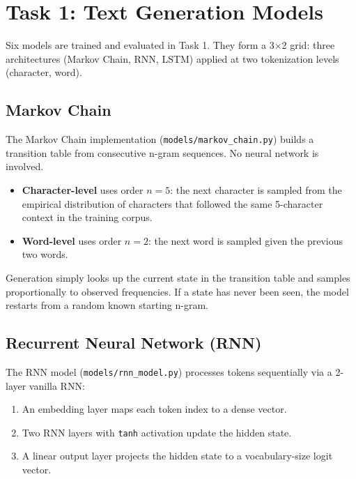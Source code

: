 \section{Task 1: Text Generation Models}
\label{sec:task1}

Six models are trained and evaluated in Task 1. They form a 3$\times$2 grid:
three architectures (Markov Chain, RNN, LSTM) applied at two tokenization levels
(character, word).

\subsection{Markov Chain}

The Markov Chain implementation (\texttt{models/markov\_chain.py}) builds a
transition table from consecutive n-gram sequences. No neural network is involved.

\begin{itemize}
    \item \textbf{Character-level} uses order $n = 5$: the next character is
          sampled from the empirical distribution of characters that followed the
          same 5-character context in the training corpus.
    \item \textbf{Word-level} uses order $n = 2$: the next word is sampled given
          the previous two words.
\end{itemize}

Generation simply looks up the current state in the transition table and samples
proportionally to observed frequencies. If a state has never been seen, the model
restarts from a random known starting n-gram.

\subsection{Recurrent Neural Network (RNN)}

The RNN model (\texttt{models/rnn\_model.py}) processes tokens sequentially via
a 2-layer vanilla RNN:

\begin{enumerate}
    \item An embedding layer maps each token index to a dense vector.
    \item Two RNN layers with \texttt{tanh} activation update the hidden state.
    \item A linear output layer projects the hidden state to a vocabulary-size
          logit vector.
\end{enumerate}

